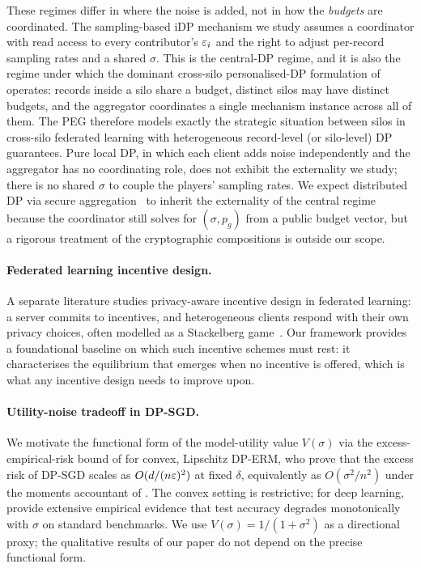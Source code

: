 These regimes differ in where the noise is added, not in how the
\emph{budgets} are coordinated. The sampling-based iDP mechanism we
study assumes a coordinator with read access to every contributor's
$\varepsilon_i$ and the right to adjust per-record sampling rates and a shared
$\sigma$. This is the central-DP regime, and it is also the regime
under which the dominant cross-silo personalised-DP formulation of
\citet{liu2024crosssilo} operates: records inside a silo share a
budget, distinct silos may have distinct budgets, and the aggregator
coordinates a single mechanism instance across all of them. The PEG
therefore models exactly the strategic situation between silos in
cross-silo federated learning with heterogeneous record-level (or
silo-level) DP guarantees. Pure local DP, in which each client adds
noise independently and the aggregator has no coordinating role, does
not exhibit the externality we study; there is no shared $\sigma$ to
couple the players' sampling rates. We expect distributed DP via
secure aggregation~\cite{bonawitz2017practical} to inherit the
externality of the central regime because the coordinator still solves
for $(\sigma, p_g)$ from a public budget vector, but a rigorous
treatment of the cryptographic compositions is outside our scope.

\paragraph{Federated learning incentive design.}
A separate literature studies privacy-aware incentive design in federated
learning: a server commits to incentives, and heterogeneous clients respond
with their own privacy choices, often modelled as a Stackelberg
game~\cite{li2024fedpcs, donahue2021optimality, tu2025idhfl, ma2024evolutionary}.
Our framework provides a foundational baseline on which such incentive
schemes must rest: it characterises the equilibrium that emerges when no
incentive is offered, which is what any incentive design needs to improve
upon.

\paragraph{Utility-noise tradeoff in DP-SGD.}
We motivate the functional form of the model-utility value $V(\sigma)$ via
the excess-empirical-risk bound of \citet{bassily2014private} for convex,
Lipschitz DP-ERM, who prove that the excess risk of DP-SGD scales as
$O(d / (n\varepsilon)^2)$ at fixed $\delta$, equivalently as $O(\sigma^2 / n^2)$
under the moments accountant of \citet{abadi2016deep}. The convex setting
is restrictive; for deep learning, \citet{tramer2021private} provide
extensive empirical evidence that test accuracy degrades monotonically with
$\sigma$ on standard benchmarks. We use $V(\sigma) = 1/(1+\sigma^2)$ as a
directional proxy; the qualitative results of our paper do not depend on
the precise functional form.
